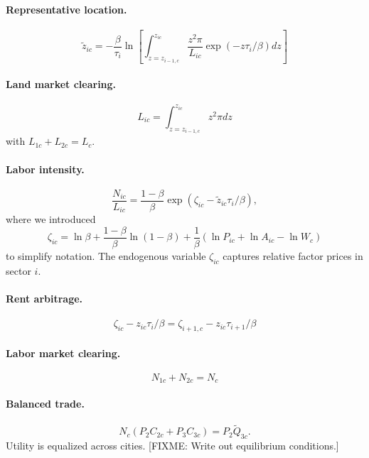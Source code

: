 \documentclass[12pt]{article}
\begin{document}
\paragraph{Representative location.}
\begin{equation}\label{eq:representative_location}
	\tilde z_{ic}
	=
	- \frac {\beta}{\tau_i}
	\ln
	\left[
	\int_{z=z_{i-1,c}}^{z_{ic}}
		\frac {z^2\pi}{L_{ic}}
		\exp(-z \tau_i/\beta)
		dz
	\right]
\end{equation}
\paragraph{Land market clearing.}
\begin{equation}\label{eq:land_market_clearing}
	L_{ic}
	=
	\int_{z=z_{i-1,c}}^{z_{ic}}
		z^2\pi
		dz
\end{equation}
with $L_{1c}+L_{2c}=L_c$.

\paragraph{Labor intensity.}
\begin{equation}\label{eq:labor_intensity}
	\frac 	{N_{ic}}
			{L_{ic}}
	=
	\frac 	{1-\beta}
			{\beta}
	\exp(\zeta_{ic}-\tilde z_{ic} \tau_i/\beta),
\end{equation}
where we introduced
\[
\zeta_{ic}=\ln\beta + \frac{1-\beta}{\beta} \ln (1-\beta)
+ \frac 1{\beta} (\ln P_{ic} + \ln A_{ic} - \ln W_c)
\]
to simplify notation. The endogenous variable $\zeta_{ic}$ captures relative factor prices in sector $i$.

\paragraph{Rent arbitrage.}
\begin{equation}\label{eq:rent_arbitrage}
	\zeta_{ic} - z_{ic} \tau_i/\beta
	=
	\zeta_{i+1,c} - z_{ic} \tau_{i+1}/\beta
\end{equation}
\paragraph{Labor market clearing.}
\begin{equation}\label{eq:labor_market_clearing}
	N_{1c}+N_{2c} = N_c
\end{equation}
\paragraph{Balanced trade.}
\begin{equation}\label{eq:balanced_trade}
N_c(P_2C_{2c} + P_3 C_{3c}) = P_2 \tilde Q_{3c}.
\end{equation}
 Utility is equalized across cities. 
[FIXME: Write out equilibrium conditions.]
\end{document}
